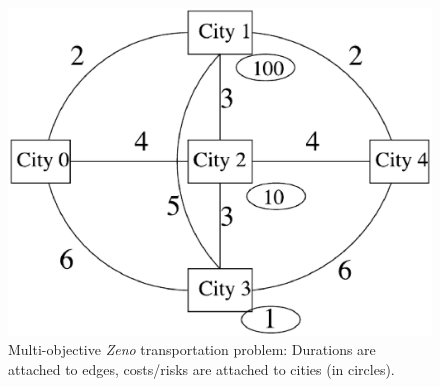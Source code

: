 \documentclass{llncs}
\begin{document}
\begin{figure}[h]
\begin{center}
 \includegraphics[bb=0 0 509 388,scale=0.35]{./instance.eps}
\caption{Multi-objective \textit{Zeno} transportation problem: Durations are attached to edges, costs/risks are attached to cities (in circles).}
\label{fig.instance}
\end{center}
\end{figure}
\end{document}
